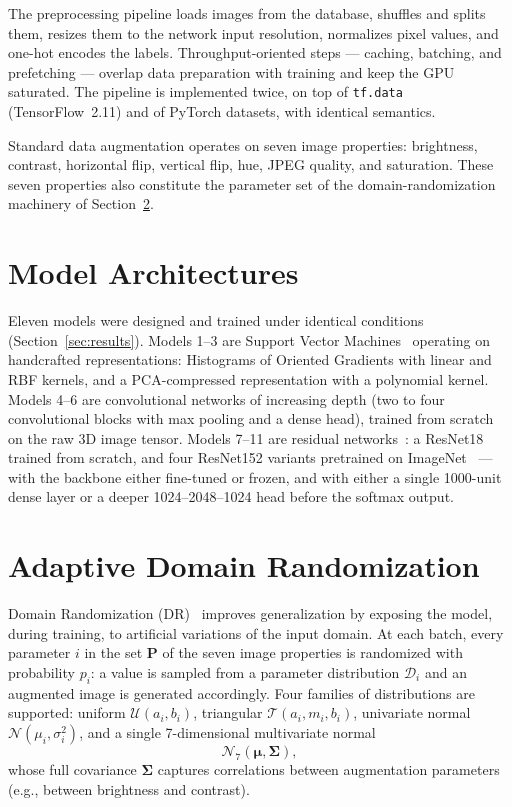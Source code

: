 \documentclass[10pt,twocolumn,a4paper]{article}
\begin{document}
The preprocessing pipeline loads images from the database, shuffles and splits them, resizes them to the network input resolution, normalizes pixel values, and one-hot encodes the labels. Throughput-oriented steps --- caching, batching, and prefetching --- overlap data preparation with training and keep the GPU saturated. The pipeline is implemented twice, on top of \texttt{tf.data} (TensorFlow~2.11) and of PyTorch datasets, with identical semantics.

Standard data augmentation operates on seven image properties: brightness, contrast, horizontal flip, vertical flip, hue, JPEG quality, and saturation. These seven properties also constitute the parameter set of the domain-randomization machinery of Section~\ref{sec:adr}.

\section{Model Architectures}
\label{sec:models}
Eleven models were designed and trained under identical conditions (Section~\ref{sec:results}). Models 1--3 are Support Vector Machines~\cite{chapelle1999svm} operating on handcrafted representations: Histograms of Oriented Gradients with linear and RBF kernels, and a PCA-compressed representation with a polynomial kernel. Models 4--6 are convolutional networks of increasing depth (two to four convolutional blocks with max pooling and a dense head), trained from scratch on the raw 3D image tensor. Models 7--11 are residual networks~\cite{he2016resnet}: a ResNet18 trained from scratch, and four ResNet152 variants pretrained on ImageNet~\cite{huh2016imagenet} --- with the backbone either fine-tuned or frozen, and with either a single 1000-unit dense layer or a deeper 1024--2048--1024 head before the softmax output.

\section{Adaptive Domain Randomization}
\label{sec:adr}
Domain Randomization (DR)~\cite{tremblay2018dr} improves generalization by exposing the model, during training, to artificial variations of the input domain. At each batch, every parameter $i$ in the set $\mathbf{P}$ of the seven image properties is randomized with probability $p_i$: a value is sampled from a parameter distribution $\mathcal{D}_i$ and an augmented image is generated accordingly. Four families of distributions are supported: uniform $\mathcal{U}(a_i, b_i)$, triangular $\mathcal{T}(a_i, m_i, b_i)$, univariate normal $\mathcal{N}(\mu_i, \sigma_i^2)$, and a single 7-dimensional multivariate normal
\begin{equation}
\mathcal{N}_7\!\left(\boldsymbol{\mu}, \boldsymbol{\Sigma}\right),
\end{equation}
whose full covariance $\boldsymbol{\Sigma}$ captures correlations between augmentation parameters (e.g., between brightness and contrast).
\end{document}
